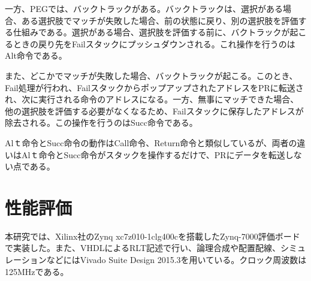 \documentclass[submit,techrep]{ipsj}
\begin{document}




一方、PEGでは、バックトラックがある\cite{BT1, BT2}。バックトラックは、選択がある場合、ある選択肢でマッチが失敗した場合、前の状態に戻り、別の選択肢を評価する仕組みである。選択がある場合、選択肢を評価する前に、バクトラックが起こるときの戻り先をFailスタックにプッシュダウンされる。これ操作を行うのはAlt命令である。

また、どこかでマッチが失敗した場合、バックトラックが起こる。このとき、Fail処理が行われ、FailスタックからポップアップされたアドレスをPRに転送され、次に実行される命令のアドレスになる。一方、無事にマッチできた場合、他の選択肢を評価する必要がなくなるため、Failスタックに保存したアドレスが除去される。この操作を行うのはSucc命令である。

Alｔ命令とSucc命令の動作はCall命令、Return命令と類似しているが、両者の違いはAlｔ命令とSucc命令がスタックを操作するだけで、PRにデータを転送しない点である。\\



\section{性能評価}

本研究では、Xilinx社のZynq xc7z010-1clg400cを搭載したZynq-7000評価ボードで実装した。また、VHDLによるRLT記述で行い、論理合成や配置配線、シミュレーションなどにはVivado Suite Design 2015.3を用いている。クロック周波数は125MHzである。
\end{document}
